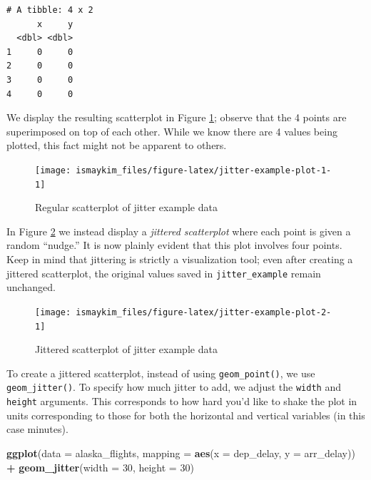 \documentclass[12pt, krantz2,]{krantz}
\makeatletter
\newenvironment{Shaded}{\begin{snugshade}}{\end{snugshade}}
\newcommand{\DataTypeTok}[1]{\textcolor[rgb]{0.27,0.27,0.27}{#1}}
\newcommand{\DecValTok}[1]{\textcolor[rgb]{0.06,0.06,0.06}{#1}}
\newcommand{\KeywordTok}[1]{\textcolor[rgb]{0.27,0.27,0.27}{\textbf{#1}}}
\newcommand{\NormalTok}[1]{#1}
\newcommand{\OperatorTok}[1]{\textcolor[rgb]{0.43,0.43,0.43}{\textbf{#1}}}
\newcommand{\StringTok}[1]{\textcolor[rgb]{0.5,0.5,0.5}{#1}}
\newenvironment{kframe}{%
\medskip{}
\setlength{\fboxsep}{.8em}
 \def\at@end@of@kframe{}%
 \ifinner\ifhmode%
  \def\at@end@of@kframe{\end{minipage}}%
  \begin{minipage}{\columnwidth}%
 \fi\fi%
 \def\FrameCommand##1{\hskip\@totalleftmargin \hskip-\fboxsep
 \colorbox{shadecolor}{##1}\hskip-\fboxsep
     \hskip-\linewidth \hskip-\@totalleftmargin \hskip\columnwidth}%
 \MakeFramed {\advance\hsize-\width
   \@totalleftmargin\z@ \linewidth\hsize
   \@setminipage}}%
 {\par\unskip\endMakeFramed%
 \at@end@of@kframe}
\renewenvironment{Shaded}{\begin{kframe}}{\end{kframe}}
\makeatother
\begin{document}
\begin{verbatim}
# A tibble: 4 x 2
      x     y
  <dbl> <dbl>
1     0     0
2     0     0
3     0     0
4     0     0
\end{verbatim}

We display the resulting scatterplot in Figure \ref{fig:jitter-example-plot-1}; observe that the 4 points are superimposed on top of each other. While we know there are 4 values being plotted, this fact might not be apparent to others.

\begin{figure}

{\centering \texttt{[image: ismaykim\_files/figure-latex/jitter-example-plot-1-1]} 

}

\caption{Regular scatterplot of jitter example data}\label{fig:jitter-example-plot-1}
\end{figure}

In Figure \ref{fig:jitter-example-plot-2} we instead display a \emph{jittered scatterplot} where each point is given a random ``nudge.'' It is now plainly evident that this plot involves four points. Keep in mind that jittering is strictly a visualization tool; even after creating a jittered scatterplot, the original values saved in \texttt{jitter\_example} remain unchanged.

\begin{figure}

{\centering \texttt{[image: ismaykim\_files/figure-latex/jitter-example-plot-2-1]} 

}

\caption{Jittered scatterplot of jitter example data}\label{fig:jitter-example-plot-2}
\end{figure}

To create a jittered scatterplot, instead of using \texttt{geom\_point()}, we use \texttt{geom\_jitter()}. To specify how much jitter to add, we adjust the \texttt{width} and \texttt{height} arguments. This corresponds to how hard you'd like to shake the plot in units corresponding to those for both the horizontal and vertical variables (in this case minutes).

\begin{Shaded}
\begin{Highlighting}[]
\KeywordTok{ggplot}\NormalTok{(}\DataTypeTok{data =}\NormalTok{ alaska_flights, }\DataTypeTok{mapping =} \KeywordTok{aes}\NormalTok{(}\DataTypeTok{x =}\NormalTok{ dep_delay, }\DataTypeTok{y =}\NormalTok{ arr_delay)) }\OperatorTok{+}\StringTok{ }
\StringTok{  }\KeywordTok{geom_jitter}\NormalTok{(}\DataTypeTok{width =} \DecValTok{30}\NormalTok{, }\DataTypeTok{height =} \DecValTok{30}\NormalTok{)}
\end{Highlighting}
\end{Shaded}
\end{document}
